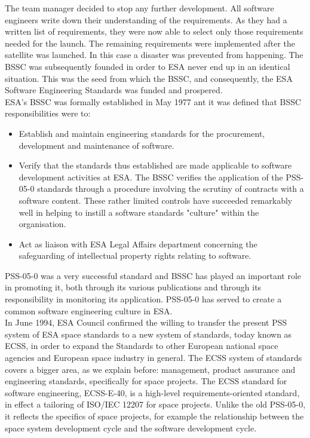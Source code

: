 The team manager decided to stop any further development. All software engineers write down their understanding of the requirements.
As they had a written list of requirements, they were now able to select only
those requirements needed for the launch. The remaining requirements were implemented after
the satellite was launched. In this case a disaster was prevented from happening\cite{Zwartjes05anagile}.
The \ac{BSSC} was subsequently founded in order to \ac{ESA} never end up in an identical situation. This was the seed from
which the \ac{BSSC}, and consequently, the \ac{ESA} Software Engineering Standards was funded and prospered.\\
\ac{ESA}'s \ac{BSSC} was formally established in May 1977 ant it was defined that \ac{BSSC} responsibilities were to:
\begin{itemize}
\item Establish and maintain engineering standards for the procurement, development and maintenance of software.
\item Verify that the standards thus established are made applicable to software
development activities at \ac{ESA}. The \ac{BSSC} verifies the application of the PSS-05-0\cite{pss-05-0} standards through a procedure involving the
scrutiny of contracts with a software content.
These rather limited controls have succeeded remarkably well in helping to instill a software standards "culture" within the organisation.
\item Act as liaison with \ac{ESA} Legal Affairs department concerning the safeguarding of intellectual
property rights relating to software.
\end{itemize}
PSS-05-0 was a very successful standard and \ac{BSSC} has played an important role in promoting it, both through its various
publications and through its responsibility in monitoring its application. PSS-05-0 has served to create a common software engineering culture in \ac{ESA}\cite{esa-bulletin-90}.\\
In June 1994, \ac{ESA} Council confirmed the willing to transfer the present PSS system of \ac{ESA} space standards to a new system
of standards, today known as \ac{ECSS}, in order to expand the Standards 
to other European national space agencies and European space industry in general.
The \ac{ECSS} system of standards covers a bigger area, as we explain before: management, product assurance and engineering standards, specifically for space projects.
The \ac{ECSS} standard for software engineering, ECSS-E-40\cite{ecss-e-st-40c}, is a high-level requirements-oriented standard, in effect a tailoring of ISO/IEC 12207 for space projects.
Unlike the old PSS-05-0, it reflects the specifics of space projects, for example the relationship between the space system development cycle and the software development cycle\cite{esa-bulletin-90}.


